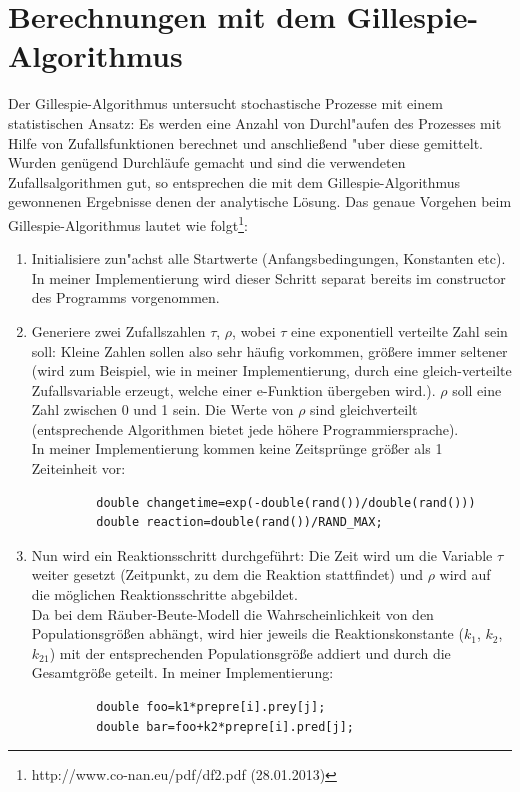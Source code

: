 \documentclass[11pt]{article}
\begin{document}
\section{Berechnungen mit dem Gillespie-Algorithmus}
Der Gillespie-Algorithmus untersucht stochastische Prozesse mit einem statistischen Ansatz: Es werden eine Anzahl von Durchl"aufen des Prozesses mit Hilfe von Zufallsfunktionen berechnet und anschließend "uber diese gemittelt. Wurden genügend Durchläufe gemacht und sind die verwendeten Zufallsalgorithmen gut, so entsprechen die mit dem Gillespie-Algorithmus gewonnenen Ergebnisse denen der analytische Lösung. Das genaue Vorgehen beim Gillespie-Algorithmus lautet wie folgt\footnote{http://www.co-nan.eu/pdf/df2.pdf (28.01.2013) }:
\begin{enumerate}
  \item Initialisiere zun"achst alle Startwerte (Anfangsbedingungen, Konstanten etc). In meiner Implementierung wird dieser Schritt separat bereits im constructor des Programms vorgenommen.
   \item Generiere zwei Zufallszahlen $\tau$, $\rho$, wobei $\tau$ eine exponentiell verteilte Zahl sein soll: Kleine Zahlen sollen also sehr häufig vorkommen, größere immer seltener (wird zum Beispiel, wie in meiner Implementierung, durch eine gleich-verteilte Zufallsvariable erzeugt, welche einer e-Funktion übergeben wird.). $\rho$ soll eine Zahl zwischen 0 und 1 sein. Die Werte von $\rho$ sind gleichverteilt (entsprechende Algorithmen bietet jede höhere Programmiersprache).\\
    In meiner Implementierung kommen keine Zeitsprünge größer als 1 Zeiteinheit vor:
         \begin{verbatim}
         double changetime=exp(-double(rand())/double(rand()))
         double reaction=double(rand())/RAND_MAX;\end{verbatim}
   \item Nun wird ein Reaktionsschritt durchgeführt: Die Zeit wird um die Variable $\tau$ weiter gesetzt (Zeitpunkt, zu dem die Reaktion stattfindet) und $\rho$ wird auf die möglichen Reaktionsschritte abgebildet. \\
   Da bei dem Räuber-Beute-Modell die Wahrscheinlichkeit von den Populationsgrößen abhängt, wird hier jeweils die Reaktionskonstante ($k_1$, $k_2$, $k_{21}$) mit der entsprechenden Populationsgröße addiert und durch die Gesamtgröße geteilt. In meiner Implementierung:
        \begin{verbatim}
         double foo=k1*prepre[i].prey[j];
         double bar=foo+k2*prepre[i].pred[j];

\end{verbatim}
\end{enumerate}
\end{document}
